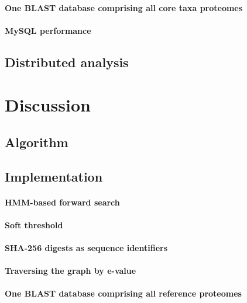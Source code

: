 \documentclass[a4paper,12pt]{scrreprt}
\begin{document}
			\subsubsection{One BLAST database comprising all core taxa proteomes}
				
			\subsubsection{MySQL performance}
				
	\section{Distributed analysis}
		

\chapter{Discussion}
	
	\section{Algorithm}
		
	\section{Implementation}
		
		\subsubsection{HMM-based forward search}
			
		\subsubsection{Soft threshold}
		\subsubsection{SHA-256 digests as sequence identifiers}
			
		\subsubsection{Traversing the graph by e-value}
			
		\subsubsection{One BLAST database comprising all reference proteomes}
			
\end{document}
